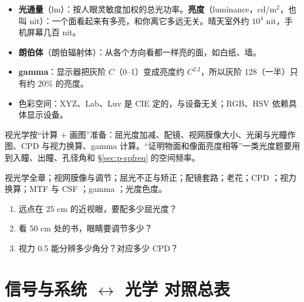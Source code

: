 \begin{itemize}
\item \textbf{光通量}（lm）：按人眼灵敏度加权的总光功率。\textbf{亮度}（luminance，cd/m$^2$，也叫 nit）：一个面看起来有多亮，和你离它多远无关。晴天室外约 $10^4$ nit，手机屏幕几百 nit。
\item \textbf{朗伯体}（朗伯辐射体）：从各个方向看都一样亮的面，如白纸、墙。
\item \textbf{gamma}：显示器把灰阶 $C$（0–1）变成亮度约 $C^{2.2}$，所以灰阶 128（一半）只有约 20\% 的亮度。
\item 色彩空间：XYZ、Lab、Luv 是 CIE 定的，与设备无关；RGB、HSV 依赖具体显示设备。
\end{itemize}

\pkao 视光学按“计算 + 画图”准备：屈光度加减、配镜、视网膜像大小、光阑与光瞳作图、CPD 与视力换算、gamma 计算。“证明物面和像面亮度相等”一类光度题要用到入瞳、出瞳、孔径角和 §\ref{sec:p-spfreq} 的空间频率。

\psee 视光学全章\pageref{ch:visual}；视网膜像与调节\pageref{sec:retimg}；屈光不正与矫正\pageref{sec:ametropia}；配镜套路\pageref{sec:correct}；老花\pageref{sec:presby}；CPD \pageref{sec:cpd}；视力换算\pageref{sec:acuity}；MTF 与 CSF \pageref{sec:mtfcsf}；gamma \pageref{sec:gamma}；光度色度\pageref{ch:photo}。

\begin{enumerate}[label=\arabic*.]
\item 远点在 25 cm 的近视眼，要配多少屈光度？
\item 看 50 cm 处的书，眼睛要调节多少？
\item 视力 0.5 能分辨多少角分？对应多少 CPD？
\end{enumerate}

\section{\texorpdfstring{信号与系统 $\leftrightarrow$ 光学 对照总表}{信号与系统 ↔ 光学 对照总表}}\label{sec:p-table}

